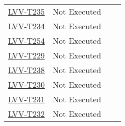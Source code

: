 \documentclass[SE,lsstdraft,STR,toc]{lsstdoc}
\begin{document}
\begin{longtable}{p{2cm}p{2.5cm}p{9cm}p{2.5cm}}
\begin{minipage}[]{9cm}
    \medskip
    \end{minipage}
    &
    \\\hline
    \href{https://jira.lsstcorp.org/secure/Tests.jspa#/testCase/LVV-T235}{LVV-T235}
    & Not Executed &
    \begin{minipage}[]{9cm}
    \smallskip
    
    \medskip
    \end{minipage}
    &
    \\\hline
    \href{https://jira.lsstcorp.org/secure/Tests.jspa#/testCase/LVV-T234}{LVV-T234}
    & Not Executed &
    \begin{minipage}[]{9cm}
    \smallskip
    
    \medskip
    \end{minipage}
    &
    \\\hline
    \href{https://jira.lsstcorp.org/secure/Tests.jspa#/testCase/LVV-T254}{LVV-T254}
    & Not Executed &
    \begin{minipage}[]{9cm}
    \smallskip
    
    \medskip
    \end{minipage}
    &
    \\\hline
    \href{https://jira.lsstcorp.org/secure/Tests.jspa#/testCase/LVV-T229}{LVV-T229}
    & Not Executed &
    \begin{minipage}[]{9cm}
    \smallskip
    
    \medskip
    \end{minipage}
    &
    \\\hline
    \href{https://jira.lsstcorp.org/secure/Tests.jspa#/testCase/LVV-T238}{LVV-T238}
    & Not Executed &
    \begin{minipage}[]{9cm}
    \smallskip
    
    \medskip
    \end{minipage}
    &
    \\\hline
    \href{https://jira.lsstcorp.org/secure/Tests.jspa#/testCase/LVV-T230}{LVV-T230}
    & Not Executed &
    \begin{minipage}[]{9cm}
    \smallskip
    
    \medskip
    \end{minipage}
    &
    \\\hline
    \href{https://jira.lsstcorp.org/secure/Tests.jspa#/testCase/LVV-T231}{LVV-T231}
    & Not Executed &
    \begin{minipage}[]{9cm}
    \smallskip
    
    \medskip
    \end{minipage}
    &
    \\\hline
    \href{https://jira.lsstcorp.org/secure/Tests.jspa#/testCase/LVV-T232}{LVV-T232}
    & Not Executed &
    \begin{minipage}[]{9cm}
    \smallskip
    

\end{minipage}
\end{longtable}
\end{document}
